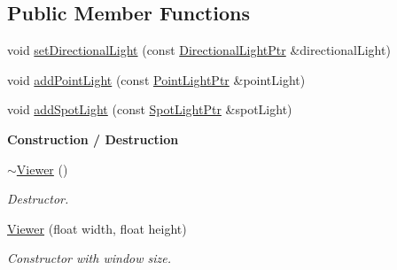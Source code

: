 \subsection*{Public Member Functions}
\begin{DoxyCompactItemize}
\item 
void \hyperlink{classViewer_a8d9ba770456d5e710522856057c2e56b}{set\+Directional\+Light} (const \hyperlink{Light_8hpp_ad8ef93288a101a8d8f185fb2a88f496d}{Directional\+Light\+Ptr} \&directional\+Light)
\item 
void \hyperlink{classViewer_a34f80351a0f686ddbc327c3b031723a3}{add\+Point\+Light} (const \hyperlink{Light_8hpp_a28898b9799350669037caef13c5115d2}{Point\+Light\+Ptr} \&point\+Light)
\item 
void \hyperlink{classViewer_a9f0aefe4012a3d934a8b032e1242d901}{add\+Spot\+Light} (const \hyperlink{Light_8hpp_a1865f598c5eed6e6e1f79d7296852092}{Spot\+Light\+Ptr} \&spot\+Light)
\end{DoxyCompactItemize}
\begin{Indent}{\bf Construction / Destruction}\par
\begin{DoxyCompactItemize}
\item 
\hyperlink{classViewer_a324e5a6a1532fe5eac3f3b0e4792b2da}{$\sim$\+Viewer} ()
\begin{DoxyCompactList}\small\item\em Destructor. \end{DoxyCompactList}\item 
\hyperlink{classViewer_a8569cd861c9a9edb86f64f53f18758dc}{Viewer} (float width, float height)
\begin{DoxyCompactList}\small\item\em Constructor with window size. \end{DoxyCompactList}\end{DoxyCompactItemize}
\end{Indent}
